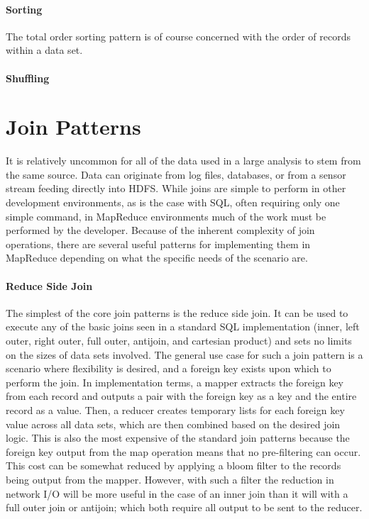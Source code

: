 \paragraph{Sorting}
The total order sorting pattern is of course concerned with the order of records within a data set. 

\paragraph{Shuffling}


\section{Join Patterns}
\label{sec:joins}
It is relatively uncommon for all of the data used in a large analysis to stem from the same source. Data can originate from log files, databases, or from a sensor stream feeding directly into HDFS. While joins are simple to perform in other development environments, as is the case with SQL, often requiring only one simple command, in MapReduce environments much of the work must be performed by the developer. Because of the inherent complexity of join operations, there are several useful patterns for implementing them in MapReduce depending on what the specific needs of the scenario are. 

\paragraph{Reduce Side Join}
The simplest of the core join patterns is the reduce side join. It can be used to execute any of the basic joins seen in a standard SQL implementation (inner, left outer, right outer, full outer, antijoin, and cartesian product) and sets no limits on the sizes of data sets involved. The general use case for such a join pattern is a scenario where flexibility is desired, and a foreign key exists upon which to perform the join. In implementation terms, a mapper extracts the foreign key from each record and outputs a pair with the foreign key as a key and the entire record as a value. Then, a reducer creates temporary lists for each foreign key value across all data sets, which are then combined based on the desired join logic. This is also the most expensive of the standard join patterns because the foreign key output from the map operation means that no pre-filtering can occur. This cost can be somewhat reduced by applying a bloom filter to the records being output from the mapper. However, with such a filter the reduction in network I/O will be more useful in the case of an inner join than it will with a full outer join or antijoin; which both require all output to be sent to the reducer. 

